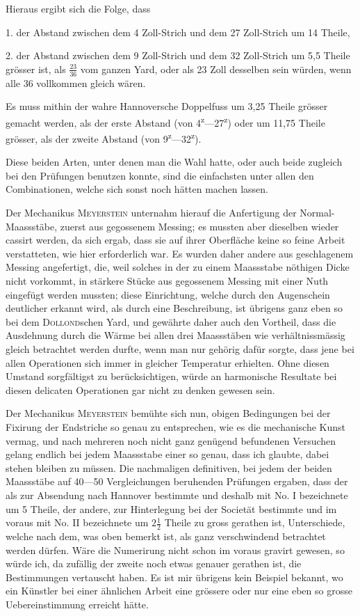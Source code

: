Hieraus ergibt sich die Folge, dass

1. der Abstand zwischen dem 4 Zoll-Strich und dem 27 Zoll-Strich um
14 Theile,

2. der Abstand zwischen dem 9 Zoll-Strich und dem 32 Zoll-Strich um
5,5 Theile grösser ist, als \(\frac{23}{36}\) vom ganzen Yard, oder als 23 Zoll desselben
sein würden, wenn alle 36 vollkommen gleich wären.

Es muss mithin der wahre Hannoversche Doppelfuss um 3,25 Theile
grösser gemacht werden, als der erste Abstand (von 4\textsuperscript{z}—27\textsuperscript{z}) oder um 11,75
Theile grösser, als der zweite Abstand (von 9\textsuperscript{z}—32\textsuperscript{z}).

Diese beiden Arten, unter denen man die Wahl hatte, oder auch beide
zugleich bei den Prüfungen benutzen konnte, sind die einfachsten unter allen
den Combinationen, welche sich sonst noch hätten machen lassen.

Der Mechanikus \textsc{Meyerstein} unternahm hierauf die Anfertigung der Normal-Maassstäbe,
zuerst aus gegossenem Messing; es mussten aber dieselben
wieder cassirt werden, da sich ergab, dass sie auf ihrer Oberfläche keine so
feine Arbeit verstatteten, wie hier erforderlich war. Es wurden daher andere
aus geschlagenem Messing angefertigt, die, weil solches in der zu einem Maassstabe
nöthigen Dicke nicht vorkommt, in stärkere Stücke aus gegossenem
Messing mit einer Nuth eingefügt werden mussten; diese Einrichtung, welche
durch den Augenschein deutlicher erkannt wird, als durch eine Beschreibung,
ist übrigens ganz eben so bei dem \textsc{Dollond}schen Yard, und gewährte daher
auch den Vortheil, dass die Ausdehnung durch die Wärme bei allen drei
Maassstäben wie verhältnissmässig gleich betrachtet werden durfte, wenn man
nur gehörig dafür sorgte, dass jene bei allen Operationen sich immer in
gleicher Temperatur erhielten. Ohne diesen Umstand sorgfältigst zu berücksichtigen,
würde an harmonische Resultate bei diesen delicaten Operationen
gar nicht zu denken gewesen sein.

Der Mechanikus \textsc{Meyerstein} bemühte sich nun, obigen Bedingungen bei
der Fixirung der Endstriche so genau zu entsprechen, wie es die mechanische
Kunst vermag, und nach mehreren noch nicht ganz genügend befundenen Versuchen
gelang endlich bei jedem Maassstabe einer so genau, dass ich glaubte, dabei
stehen bleiben zu müssen. Die nachmaligen definitiven, bei jedem der beiden
\clearpage{}
\noindent Maassstäbe auf 40—50 Vergleichungen beruhenden Prüfungen ergaben, dass
der als zur Absendung nach Hannover bestimmte und deshalb 
mit No. I bezeichnete um 5 Theile, der andere, zur Hinterlegung bei der
Societät bestimmte und im voraus mit No. II bezeichnete um \(2\frac{1}{2}\) Theile
zu gross gerathen ist, Unterschiede, welche nach dem, was oben bemerkt
ist, als ganz verschwindend betrachtet werden dürfen. Wäre die Numerirung
nicht schon im voraus gravirt gewesen, so würde ich, da zufällig der zweite
noch etwas genauer gerathen ist, die Bestimmungen vertauscht haben. Es ist
mir übrigens kein Beispiel bekannt, wo ein Künstler bei einer ähnlichen Arbeit
eine grössere oder nur eine eben so grosse Uebereinstimmung erreicht
hätte.

